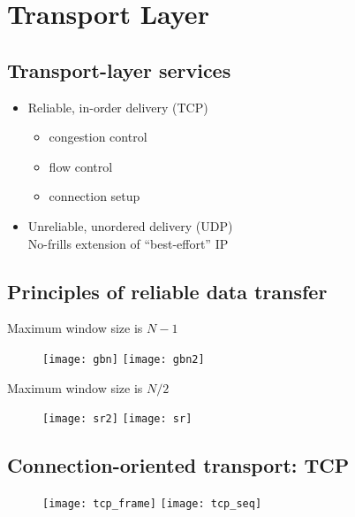 \section{Transport Layer}

\subsection{Transport-layer services}

\begin{itemize}
  \item Reliable, in-order delivery (TCP)
    \begin{itemize}
      \item congestion control
      \item flow control
      \item connection setup
    \end{itemize}

  \item Unreliable, unordered delivery (UDP)\\
    No-frills extension of ``best-effort'' IP
\end{itemize}

\subsection{Principles of reliable data transfer}

 Maximum window size is $N-1$
\begin{figure}[H]
  \centering
  \texttt{[image: gbn]}
  \texttt{[image: gbn2]}
\end{figure}

 Maximum window size is $N/2$
\begin{figure}[H]
  \centering
  \texttt{[image: sr2]}
  \texttt{[image: sr]}
\end{figure}

\subsection{Connection-oriented transport: TCP}

\begin{figure}[H]
  \centering
  \texttt{[image: tcp\_frame]}
  \texttt{[image: tcp\_seq]}
\end{figure}

